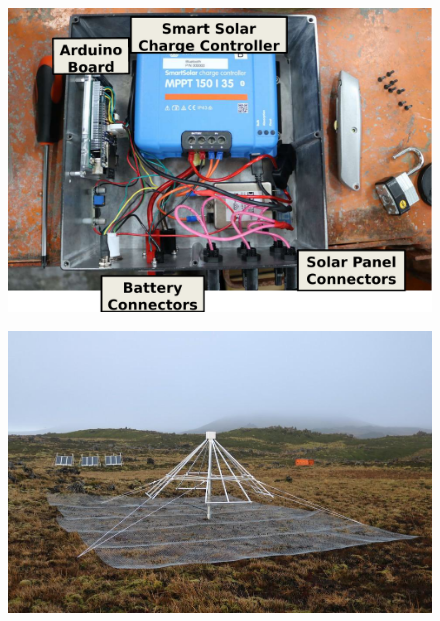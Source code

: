 \begin{figure}
	\centering
	\includegraphics[width=\linewidth]{Figures/power_box_interior}
	\caption{}
	\label{fig:power_box_interior}
\end{figure}

\begin{figure}
	\centering
	\includegraphics[width=\linewidth]{Figures/station}
	\caption{}
	\label{fig:station}
\end{figure}
